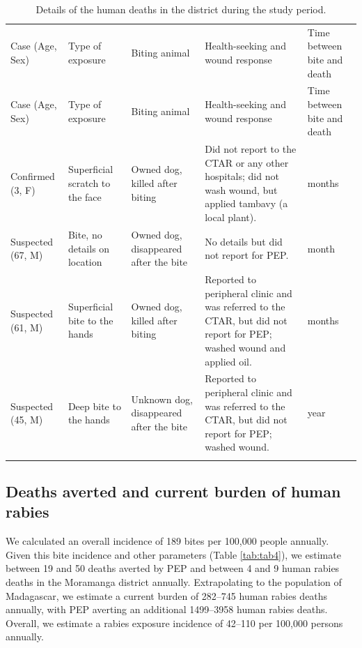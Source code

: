 \documentclass[
  oneside]{book}
\begin{document}
\begin{longtable}[]{@{}
  >{\raggedright\arraybackslash}p{}
  >{\raggedright\arraybackslash}p{}
  >{\raggedright\arraybackslash}p{}
  >{\raggedright\arraybackslash}p{}
  >{\raggedright\arraybackslash}p{}@{}}
\caption{\label{tab:tab3} Details of the human deaths in the district during the study period.}\tabularnewline
\toprule
Case (Age, Sex) & Type of exposure & Biting animal & Health-seeking and wound response & Time between bite and death \\ \addlinespace
\midrule
\endfirsthead
\toprule
Case (Age, Sex) & Type of exposure & Biting animal & Health-seeking and wound response & Time between bite and death \\ \addlinespace
\midrule
\endhead
Confirmed (3, F) & Superficial scratch to the face & Owned dog, killed after biting & Did not report to the CTAR or any other hospitals; did not wash wound, but applied tambavy (a local plant). & 12 months \\ \addlinespace
Suspected (67, M) & Bite, no details on location & Owned dog, disappeared after the bite & No details but did not report for PEP. & 1 month \\ \addlinespace
Suspected (61, M) & Superficial bite to the hands & Owned dog, killed after biting & Reported to peripheral clinic and was referred to the CTAR, but did not report for PEP; washed wound and applied oil. & 2 months \\ \addlinespace
Suspected (45, M) & Deep bite to the hands & Unknown dog, disappeared after the bite & Reported to peripheral clinic and was referred to the CTAR, but did not report for PEP; washed wound. & 1 year \\ \addlinespace
\bottomrule
\end{longtable}

\hypertarget{deaths-averted-and-current-burden-of-human-rabies}{%
\subsection{Deaths averted and current burden of human rabies}\label{deaths-averted-and-current-burden-of-human-rabies}}

We calculated an overall incidence of 189 bites per 100,000 people annually. Given this bite incidence and other parameters (Table \ref{tab:tab4}), we estimate between 19 and 50 deaths averted by PEP and between 4 and 9 human rabies deaths in the Moramanga district annually. Extrapolating to the population of Madagascar, we estimate a current burden of 282--745 human rabies deaths annually, with PEP averting an additional 1499--3958 human rabies deaths. Overall, we estimate a rabies exposure incidence of 42--110 per 100,000 persons annually.
\end{document}
